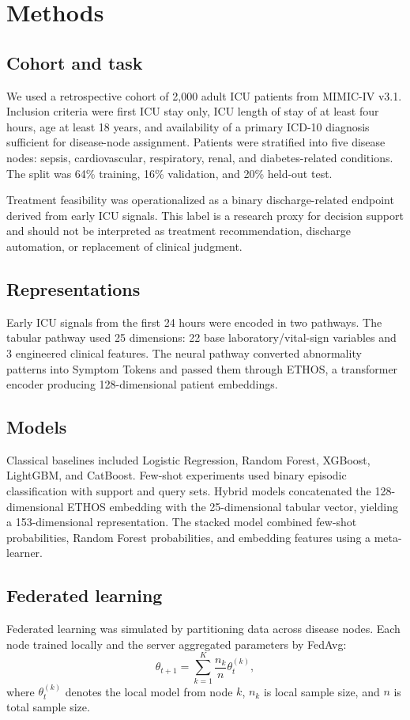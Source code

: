 \documentclass[11pt]{article}
\newcommand{\modelname}{ETHOS}
\newcommand{\mimic}{MIMIC-IV v3.1}
\begin{document}
\section{Methods}
\subsection{Cohort and task}
We used a retrospective cohort of 2,000 adult ICU patients from \mimic{}. Inclusion criteria were first ICU stay only, ICU length of stay of at least four hours, age at least 18 years, and availability of a primary ICD-10 diagnosis sufficient for disease-node assignment. Patients were stratified into five disease nodes: sepsis, cardiovascular, respiratory, renal, and diabetes-related conditions. The split was 64\% training, 16\% validation, and 20\% held-out test.

Treatment feasibility was operationalized as a binary discharge-related endpoint derived from early ICU signals. This label is a research proxy for decision support and should not be interpreted as treatment recommendation, discharge automation, or replacement of clinical judgment.

\subsection{Representations}
Early ICU signals from the first 24 hours were encoded in two pathways. The tabular pathway used 25 dimensions: 22 base laboratory/vital-sign variables and 3 engineered clinical features. The neural pathway converted abnormality patterns into Symptom Tokens and passed them through \modelname{}, a transformer encoder producing 128-dimensional patient embeddings.

\subsection{Models}
Classical baselines included Logistic Regression, Random Forest, XGBoost, LightGBM, and CatBoost. Few-shot experiments used binary episodic classification with support and query sets. Hybrid models concatenated the 128-dimensional \modelname{} embedding with the 25-dimensional tabular vector, yielding a 153-dimensional representation. The stacked model combined few-shot probabilities, Random Forest probabilities, and embedding features using a meta-learner.

\subsection{Federated learning}
Federated learning was simulated by partitioning data across disease nodes. Each node trained locally and the server aggregated parameters by FedAvg:
\begin{equation}
\theta_{t+1}=\sum_{k=1}^{K}\frac{n_k}{n}\theta_t^{(k)},
\end{equation}
where $\theta_t^{(k)}$ denotes the local model from node $k$, $n_k$ is local sample size, and $n$ is total sample size.
\end{document}
